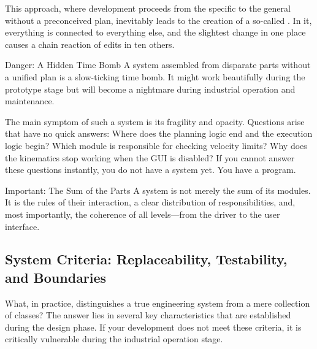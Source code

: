 This approach, where development proceeds from the specific to the general without a preconceived plan, inevitably leads to the creation of a so-called . In it, everything is connected to everything else, and the slightest change in one place causes a chain reaction of edits in ten others.

\begin{dangerbox}{Danger: A Hidden Time Bomb}
A system assembled from disparate parts without a unified plan is a slow-ticking time bomb. It might work beautifully during the prototype stage but will become a nightmare during industrial operation and maintenance.
\end{dangerbox}

The main symptom of such a system is its fragility and opacity. Questions arise that have no quick answers: Where does the planning logic end and the execution logic begin? Which module is responsible for checking velocity limits? Why does the kinematics stop working when the GUI is disabled? If you cannot answer these questions instantly, you do not have a system yet. You have a program.

\begin{principlebox}{Important: The Sum of the Parts}
A system is not merely the sum of its modules. It is the rules of their interaction, a clear distribution of responsibilities, and, most importantly, the coherence of all levels—from the driver to the user interface.
\end{principlebox}

\subsection{System Criteria: Replaceability, Testability, and Boundaries}

What, in practice, distinguishes a true engineering system from a mere collection of classes? The answer lies in several key characteristics that are established during the design phase. If your development does not meet these criteria, it is critically vulnerable during the industrial operation stage.


